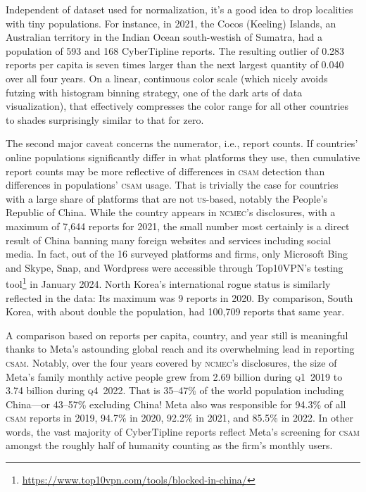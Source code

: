 \documentclass[nonacm,screen]{acmart}
\newcommand\V[1]{\textsc{\MakeLowercase{#1}}}
\begin{document}
\begin{itemize}
{Independent of dataset used for normalization, it's a good idea to drop
localities with tiny populations. For instance, in 2021, the Cocos (Keeling)
Islands, an Australian territory in the Indian Ocean south-westish of Sumatra,
had a population of 593 and 168 CyberTipline reports. The resulting outlier of
0.283 reports per capita is seven times larger than the next largest quantity of
0.040 over all four years. On a linear, continuous color scale (which nicely
avoids futzing with histogram binning strategy, one of the dark arts of data
visualization), that effectively compresses the color range for all other
countries to shades surprisingly similar to that for zero.

The second major caveat concerns the numerator, i.e., report counts. If
countries' online populations significantly differ in what platforms they use,
then cumulative report counts may be more reflective of differences in \V{CSAM}
detection than differences in populations' \V{CSAM} usage. That is trivially the
case for countries with a large share of platforms that are not \V{US}-based,
notably the People's Republic of China. While the country appears in \V{NCMEC}'s
disclosures, with a maximum of 7,644 reports for 2021, the small number most
certainly is a direct result of China banning many foreign websites and services
including social media. In fact, out of the 16 surveyed platforms and firms,
only Microsoft Bing and Skype, Snap, and Wordpress were accessible through
Top10VPN's testing
tool\footnote{\url{https://www.top10vpn.com/tools/blocked-in-china/}} in January
2024. North Korea's international rogue status is similarly reflected in the
data: Its maximum was 9 reports in 2020. By comparison, South Korea, with about
double the population, had 100,709 reports that same year.

A comparison based on reports per capita, country, and year still is meaningful
thanks to Meta's astounding global reach and its overwhelming lead in reporting
\V{CSAM}. Notably, over the four years covered by \V{NCMEC}'s disclosures, the
size of Meta's family monthly active people grew from 2.69 billion during
\V{Q1}~2019 to 3.74 billion during \V{Q4}~2022. That is 35--47\% of the world
population including China---or 43--57\% excluding China! Meta also was
responsible for 94.3\% of all \V{CSAM} reports in 2019, 94.7\% in 2020, 92.2\%
in 2021, and 85.5\% in 2022. In other words, the vast majority of CyberTipline
reports reflect Meta's screening for \V{CSAM} amongst the roughly half of
humanity counting as the firm's monthly users.

}
\end{itemize}
\end{document}
